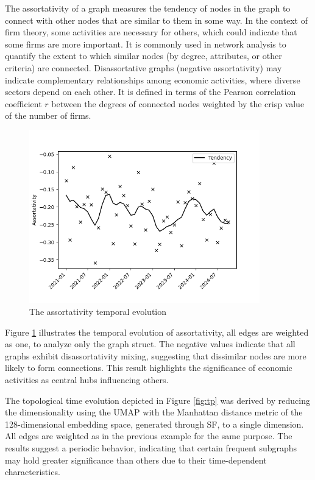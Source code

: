 \documentclass[12pt]{article}
\begin{document}
The assortativity of a graph measures the tendency of nodes in the graph to connect with other nodes that are similar to them in some way. In the context of firm theory, some activities are necessary for others, which could indicate that some firms are more important. It is commonly used in network analysis to quantify the extent to which similar nodes (by degree, attributes, or other criteria) are connected. Disassortative graphs (negative assortativity) may indicate complementary relationships among economic activities, where diverse sectors depend on each other.
It is defined in terms of the Pearson correlation coefficient $r$ between the degrees of connected nodes weighted by the crisp value of the number of firms.
\begin{figure}[H]
\includegraphics[width=10cm]{assorativity.png}
\centering
 \caption{The assortativity temporal evolution}
    \label{fig:assortativity}
\end{figure}

Figure \ref{fig:assortativity} illustrates the temporal evolution of assortativity, all edges are weighted as one, to analyze only the graph struct. The negative values indicate that all graphs exhibit disassortativity mixing, suggesting that dissimilar nodes are more likely to form connections. This result highlights the significance of economic activities as central hubs influencing others.

The topological time evolution depicted in Figure \ref{fig:tp} was derived by reducing the dimensionality using the UMAP with the Manhattan distance metric of the 128-dimensional embedding space, generated through SF, to a single dimension. All edges are weighted as in the previous example for the same purpose. The results suggest a periodic behavior, indicating that certain frequent subgraphs may hold greater significance than others due to their time-dependent characteristics.
\end{document}
